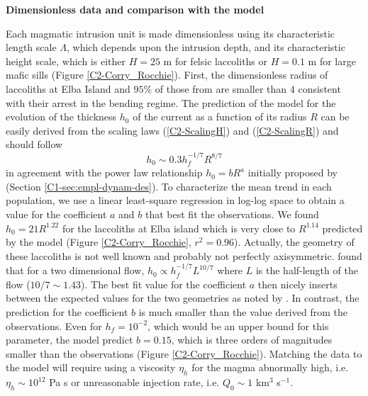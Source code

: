 \vspace{.5cm}  \textbf{Dimensionless  data  and  comparison  with  the
  model} \vspace{.5cm}

Each  magmatic   intrusion  unit  is  made   dimensionless  using  its
characteristic  length   scale  $\Lambda$,  which  depends   upon  the
intrusion depth, and its characteristic  height scale, which is either
$H=25$ m  for felsic  laccoliths or  $H=0.1$ m  for large  mafic sills
(Figure \ref{C2-Corry_Rocchie}).   First, the dimensionless  radius of
laccoliths at  Elba Island and  $95\%$ of those  from \citet{E:2015tl}
are  smaller than  $4$ consistent  with  their arrest  in the  bending
regime. The prediction of the model for the evolution of the thickness
$h_0$ of  the current as  a function of its  radius $R$ can  be easily
derived    from    the    scaling   laws    (\ref{C2-ScalingH})    and
(\ref{C2-ScalingR}) and should follow
\begin{equation}
  h_0 \sim 0.3h_f^{-1/7} R^{8/7}\label{C2-Hr}
\end{equation}
in agreement  with the power  law relationship $h_0 =  bR^a$ initially
proposed         by          \citet{McCaffrey:1997ea}         (Section
\ref{C1-sec:empl-dynam-des}).  To characterize the  mean trend in each
population, we use  a linear least-square regression  in log-log space
to obtain a  value for the coefficient  $a$ and $b$ that  best fit the
observations.  We found $h_0 = 21 R^{1.22}$ for the laccoliths at Elba
island  which is  very  close  to $R^{1.14}$  predicted  by the  model
(Figure \ref{C2-Corry_Rocchie},  $r^2=0.96$).  Actually,  the geometry
of  these laccoliths  is not  well  known and  probably not  perfectly
axisymmetric.   \citet{Anonymous:QWXp_4JV}   found  that  for   a  two
dimensional  flow, $h_0\propto  h_f^{-1/7}L^{10/7}$ where  $L$ is  the
half-length of the flow ($10/7\sim 1.43$).  The best fit value for the
coefficient $a$  then nicely inserts  between the expected  values for
the two  geometries as noted by  \citet{Michaut:2011kg}.  In contrast,
the prediction for the coefficient $b$  is much smaller than the value
derived from the observations.  Even for $h_f=10^{-2}$, which would be
an upper bound  for this parameter, the model  predict $b=0.15$, which
is three  orders of magnitudes  smaller than the  observations (Figure
\ref{C2-Corry_Rocchie}).  Matching the data  to the model will require
using  a  viscosity  $\eta_h$  for the  magma  abnormally  high,  i.e.
$\eta_h   \sim  10^{12}$   Pa  s   or  unreasonable   injection  rate,
i.e. $Q_0\sim 1$ km$^3$ s$^{-1}$.

